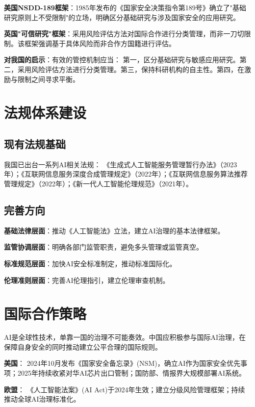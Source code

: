\textbf{美国NSDD-189框架}：1985年发布的《国家安全决策指令第189号》确立了"基础研究原则上不受限制"的立场，明确区分基础研究与涉及国家安全的应用研究。

\textbf{英国"可信研究"框架}：采用风险评估方法对国际合作进行分类管理，而非一刀切限制。该框架强调基于具体风险而非合作方国籍进行评估。

\textbf{对我国的启示}：有效的管控机制应当：
第一，区分基础研究与敏感应用研究。第二，采用风险评估方法进行分类管理。第三，保持科研机构的自主性。第四，在激励与限制之间寻求平衡。

\section{法规体系建设}

\subsection{现有法规基础}

我国已出台一系列AI相关法规：
《生成式人工智能服务管理暂行办法》（2023年）；《互联网信息服务深度合成管理规定》（2022年）；《互联网信息服务算法推荐管理规定》（2022年）；《新一代人工智能伦理规范》（2021年）。

\subsection{完善方向}

\textbf{基础法律层面}：推动《人工智能法》立法，建立AI治理的基本法律框架。

\textbf{监管协调层面}：明确各部门监管职责，避免多头管理或监管真空。

\textbf{标准规范层面}：加快AI安全标准制定，推动标准国际化。

\textbf{伦理准则层面}：完善AI伦理指引，建立伦理审查机制。

\section{国际合作策略}

AI是全球性技术，单靠一国的治理不可能奏效。中国应积极参与国际AI治理，在保障自身安全的同时推动建立公平合理的国际规则。

\textbf{美国}：
2024年10月发布《国家安全备忘录》(NSM)，确立AI作为国家安全优先事项；2025年持续收紧对华AI芯片出口管制；国防部、情报界大规模部署AI系统。

\textbf{欧盟}：
《人工智能法案》(AI Act)于2024年生效；建立分级风险管理框架；持续推动全球AI治理标准化。

